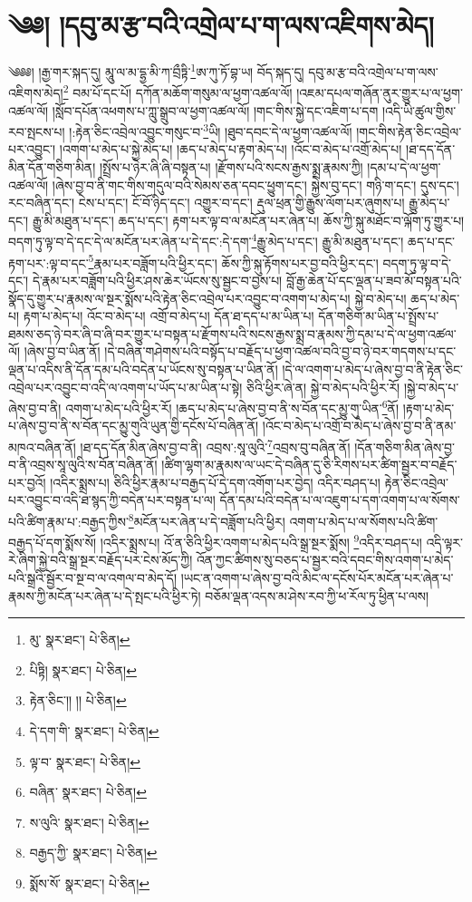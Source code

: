 \setcounter{footnote}{0} 
\chapter{༄༅། །དབུ་མ་རྩ་བའི་འགྲེལ་པ་ག་ལས་འཇིགས་མེད།}༄༅༅། །རྒྱ་གར་སྐད་དུ། མཱུ་ལ་མ་དྷྱ་མི་ཀ་བྲྀཏྟི་\footnote{མུ་  སྣར་ཐང་།  པེ་ཅིན། }ཨ་ཀུ་ཏོ་བྷ་ཡ། བོད་སྐད་དུ། དབུ་མ་རྩ་བའི་འགྲེལ་པ་ག་ལས་འཇིགས་མེད།\footnote{པིཏྟི།  སྣར་ཐང་།  པེ་ཅིན། } བམ་པོ་དང་པོ། དཀོན་མཆོག་གསུམ་ལ་ཕྱག་འཚལ་ལོ། །འཇམ་དཔལ་གཞོན་ནུར་གྱུར་པ་ལ་ཕྱག་འཚལ་ལོ། །སློབ་དཔོན་འཕགས་པ་ཀླུ་སྒྲུབ་ལ་ཕྱག་འཚལ་ལོ། །གང་གིས་སྐྱེ་དང་འཇིག་པ་དག །འདི་ཡི་ཚུལ་གྱིས་རབ་སྤངས་པ། །:རྟེན་ཅིང་འབྲེལ་འབྱུང་གསུང་བ་\footnote{རྟེན་ཅིང་།། །།  པེ་ཅིན། }ཡི། །ཐུབ་དབང་དེ་ལ་ཕྱག་འཚལ་ལོ། །གང་གིས་རྟེན་ཅིང་འབྲེལ་པར་འབྱུང་། །འགག་པ་མེད་པ་སྐྱེ་མེད་པ། །ཆད་པ་མེད་པ་རྟག་མེད་པ། །འོང་བ་མེད་པ་འགྲོ་མེད་པ། །ཐ་དད་དོན་མིན་དོན་གཅིག་མིན། །སྤྲོས་པ་ཉེར་ཞི་ཞི་བསྟན་པ། །རྫོགས་པའི་སངས་རྒྱས་སྨྲ་རྣམས་ཀྱི། །དམ་པ་དེ་ལ་ཕྱག་འཚལ་ལོ། །ཞེས་བྱ་བ་ནི་གང་གིས་གདུལ་བའི་སེམས་ཅན་དབང་ཕྱུག་དང་། སྐྱེས་བུ་དང་། གཉི་ག་དང་། དུས་དང་། རང་བཞིན་དང་། ངེས་པ་དང་། ངོ་བོ་ཉིད་དང་། འགྱུར་བ་དང་། རྡུལ་ཕྲན་གྱི་རྒྱུས་ལོག་པར་ཞུགས་པ། རྒྱུ་མེད་པ་དང་། རྒྱུ་མི་མཐུན་པ་དང་། ཆད་པ་དང་། རྟག་པར་ལྟ་བ་ལ་མངོན་པར་ཞེན་པ། ཆོས་ཀྱི་སྐུ་མཐོང་བ་ལྐོག་ཏུ་གྱུར་པ། བདག་ཏུ་ལྟ་བ་དེ་དང་དེ་ལ་མངོན་པར་ཞེན་པ་དེ་དང་:དེ་དག་\footnote{དེ་དག་གི་  སྣར་ཐང་།  པེ་ཅིན། }རྒྱུ་མེད་པ་དང་། རྒྱུ་མི་མཐུན་པ་དང་། ཆད་པ་དང་རྟག་པར་:ལྟ་བ་དང་\footnote{ལྟ་བ་  སྣར་ཐང་།  པེ་ཅིན། }རྣམ་པར་བཟློག་པའི་ཕྱིར་དང་། ཆོས་ཀྱི་སྐུ་རྟོགས་པར་བྱ་བའི་ཕྱིར་དང་། བདག་ཏུ་ལྟ་བ་དེ་དང་། དེ་རྣམ་པར་བཟློག་པའི་ཕྱིར་ཤས་ཆེར་ཡོངས་སུ་སྦྱང་བ་བྱས་པ། བློ་རྒྱ་ཆེན་པོ་དང་ལྡན་པ་ཟབ་མོ་བསྟན་པའི་སྣོད་དུ་གྱུར་པ་རྣམས་ལ་སྔར་སྨོས་པའི་རྟེན་ཅིང་འབྲེལ་པར་འབྱུང་བ་འགག་པ་མེད་པ། སྐྱེ་བ་མེད་པ། ཆད་པ་མེད་པ། རྟག་པ་མེད་པ། འོང་བ་མེད་པ། འགྲོ་བ་མེད་པ། དོན་ཐ་དད་པ་མ་ཡིན་པ། དོན་གཅིག་མ་ཡིན་པ་སྤྲོས་པ་ཐམས་ཅད་ཉེ་བར་ཞི་བ་ཞི་བར་གྱུར་པ་བསྟན་པ་རྫོགས་པའི་སངས་རྒྱས་སྨྲ་བ་རྣམས་ཀྱི་དམ་པ་དེ་ལ་ཕྱག་འཚལ་ལོ། །ཞེས་བྱ་བ་ཡིན་ནོ། །དེ་བཞིན་གཤེགས་པའི་བསྟོད་པ་བརྗོད་པ་ཕྱག་འཚལ་བའི་བྱ་བ་ཉེ་བར་གདགས་པ་དང་ལྡན་པ་འདིས་ནི་དོན་དམ་པའི་བདེན་པ་ཡོངས་སུ་བསྟན་པ་ཡིན་ནོ། །དེ་ལ་འགག་པ་མེད་པ་ཞེས་བྱ་བ་ནི་རྟེན་ཅིང་འབྲེལ་པར་འབྱུང་བ་འདི་ལ་འགག་པ་ཡོད་པ་མ་ཡིན་པ་སྟེ། ཅིའི་ཕྱིར་ཞེ་ན། སྐྱེ་བ་མེད་པའི་ཕྱིར་རོ། །སྐྱེ་བ་མེད་པ་ཞེས་བྱ་བ་ནི། འགག་པ་མེད་པའི་ཕྱིར་རོ། །ཆད་པ་མེད་པ་ཞེས་བྱ་བ་ནི་ས་བོན་དང་མྱུ་གུ་ཡིན་\footnote{བཞིན་  སྣར་ཐང་།  པེ་ཅིན། }ནོ། །རྟག་པ་མེད་པ་ཞེས་བྱ་བ་ནི་ས་བོན་དང་མྱུ་གུའི་ཡུན་གྱི་དངོས་པོ་བཞིན་ནོ། །འོང་བ་མེད་པ་འགྲོ་བ་མེད་པ་ཞེས་བྱ་བ་ནི་ནམ་མཁའ་བཞིན་ནོ། །ཐ་དད་དོན་མིན་ཞེས་བྱ་བ་ནི། འབྲས་:སཱ་ལུའི་\footnote{ས་ལུའི་  སྣར་ཐང་།  པེ་ཅིན། }འབྲས་བུ་བཞིན་ནོ། །དོན་གཅིག་མིན་ཞེས་བྱ་བ་ནི་འབྲས་སཱ་ལུའི་ས་བོན་བཞིན་ནོ། །ཚིག་ལྷག་མ་རྣམས་ལ་ཡང་དེ་བཞིན་དུ་ཅི་རིགས་པར་ཚིག་སྦྱར་བ་བརྗོད་པར་བྱའོ། །འདིར་སྨྲས་པ། ཅིའི་ཕྱིར་རྣམ་པ་བརྒྱད་པོ་དེ་དག་འགོག་པར་བྱེད། འདིར་བཤད་པ། རྟེན་ཅིང་འབྲེལ་པར་འབྱུང་བ་འདི་ཐ་སྙད་ཀྱི་བདེན་པར་བསྟན་པ་ལ། དོན་དམ་པའི་བདེན་པ་ལ་འཇུག་པ་དག་འགག་པ་ལ་སོགས་པའི་ཚིག་རྣམ་པ་:བརྒྱད་ཀྱིས་\footnote{བརྒྱད་ཀྱི་  སྣར་ཐང་།  པེ་ཅིན། }མངོན་པར་ཞེན་པ་དེ་བཟློག་པའི་ཕྱིར། འགག་པ་མེད་པ་ལ་སོགས་པའི་ཚིག་བརྒྱད་པོ་དག་སྨོས་སོ། །འདིར་སྨྲས་པ། འོ་ན་ཅིའི་ཕྱིར་འགག་པ་མེད་པའི་སྒྲ་སྔར་སྨོས། \footnote{སྨོས་སོ་  སྣར་ཐང་།  པེ་ཅིན། }འདིར་བཤད་པ། འདི་ལྟར་རེ་ཞིག་སྐྱེ་བའི་སྒྲ་སྔར་བརྗོད་པར་ངེས་མོད་ཀྱི། འོན་ཀྱང་ཚིགས་སུ་བཅད་པ་སྦྱར་བའི་དབང་གིས་འགག་པ་མེད་པའི་སྒྲའི་སྦྱོར་བ་སྔ་བ་ལ་འགལ་བ་མེད་དོ། །ཡང་ན་འགག་པ་ཞེས་བྱ་བའི་མིང་ལ་དངོས་པོར་མངོན་པར་ཞེན་པ་རྣམས་ཀྱི་མངོན་པར་ཞེན་པ་དེ་སྤང་པའི་ཕྱིར་ཏེ། བཅོམ་ལྡན་འདས་མ་ཤེས་རབ་ཀྱི་ཕ་རོལ་ཏུ་ཕྱིན་པ་ལས། 